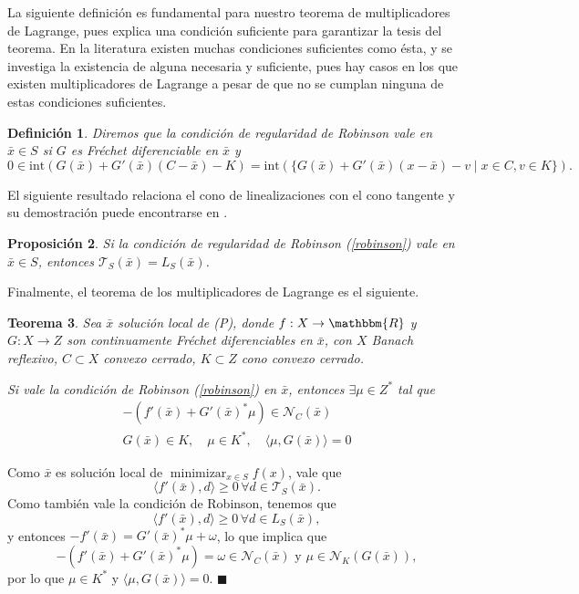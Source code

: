\documentclass[a4paper,10pt]{book}
\newcommand{\R}{\mathbbm{R}}
\newcommand{\arr}{\rightarrow}
\newcommand{\bx}{\bar{x}}
\newcommand{\cN}{\mathcal{N}}
\newcommand{\cT}{\mathcal{T}}
\newcommand{\la}{\langle}
\newcommand{\ra}{\rangle}
\newtheorem{teo}{Teorema}[section]
\newtheorem{prop}[teo]{Proposici\'on}
\newtheorem{defi}[teo]{Definici\'on}
\newenvironment{dem}{\vspace*{-0.1cm}{\it Demostraci\'on:}}{\hfill
$\blacksquare$\\}
\begin{document}
La siguiente definición es fundamental para nuestro teorema de multiplicadores de Lagrange, pues explica una condición suficiente para garantizar la tesis del teorema.
En la literatura existen muchas condiciones suficientes como ésta, y se investiga la existencia de alguna necesaria y suficiente, pues hay casos en los que existen multiplicadores de Lagrange a pesar de que no se cumplan ninguna de estas condiciones suficientes.
\begin{defi}
 Diremos que la condición de regularidad de Robinson vale en $\bx\in S$ si $G$ es Fréchet diferenciable en $\bx$ y 
 \begin{equation}\label{robinson}
0\in \mathrm{int}\left(G(\bx) + G'(\bx)(C-\bx)-K\right)=\mathrm{int}(\{G(\bx) + G'(\bx)(x-\bx)-v \mid x\in C , v\in K\}).
 \end{equation}
\end{defi} 

El siguiente resultado relaciona el cono de linealizaciones con el cono tangente y su demostración puede encontrarse en \cite[Corollary 2.91]{bonnans2013perturbation}.
\begin{prop}
 Si la condición de regularidad de Robinson (\ref{robinson}) vale en $\bx \in S$, entonces $\cT_S(\bx) = L_S(\bx)$.
\end{prop}

Finalmente, el teorema de los multiplicadores de Lagrange es el siguiente.

\begin{teo}\label{lagrinf}
Sea $\bx$ solución local de (P), donde $f:X\arr\R$ y $G:X\arr Z$ son continuamente Fréchet diferenciables en $\bx$, con $X$ Banach reflexivo, $C\subset X$ convexo cerrado, $K\subset Z$ cono convexo cerrado.

Si vale la condición de Robinson (\ref{robinson}) en $\bx$, entonces $\exists \mu\in Z^*$ tal que 
\begin{equation}\label{condOptim}
\begin{array}{c}
         -(f'(\bx) + G'(\bx)^*\mu)\in \cN_C(\bx)\\
          G(\bx)\in K,\quad \mu\in K^* ,\quad \langle\mu , G(\bx)\rangle = 0
         \end{array}
\end{equation}
\end{teo} 
\begin{dem}
Como $\bx$ es solución local de $\displaystyle \mathop{\mathrm{minimizar}}_{x\in S}\displaystyle f(x)$, vale que $$\la f'(\bx),d\ra\geq0\,\forall d\in\cT_S(\bx).$$ Como también vale la condición de Robinson, tenemos que $$\la f'(\bx),d\ra\geq0\,\forall d\in L_S(\bx),$$ y entonces $-f'(\bx)=G'(\bx)^*\mu+\omega$, lo que implica que $$-(f'(\bx)+G'(\bx)^*\mu)=\omega\in\cN_C(\bx)\mbox{ y }\mu\in\cN_K(G(\bx)),$$ por lo que $\mu\in K^*$ y $\la \mu,G(\bx)\ra=0$.
\end{dem}
\end{document}
